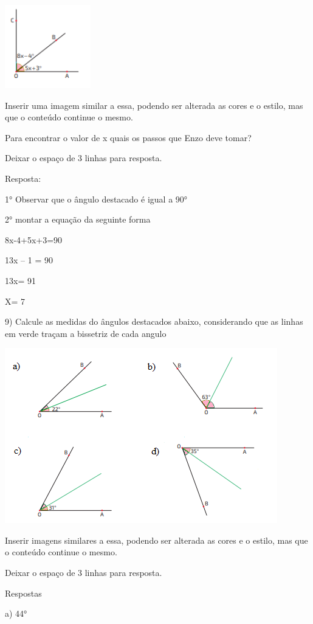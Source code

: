 \includegraphics[width=1.47134in,height=1.42708in]{./imgSAEB_8_MAT/media/image31.png}

Inserir uma imagem similar a essa, podendo ser alterada as cores e o
estilo, mas que o conteúdo continue o mesmo.

Para encontrar o valor de x quais os passos que Enzo deve tomar?

Deixar o espaço de 3 linhas para resposta.

Resposta:

1° Observar que o ângulo destacado é igual a 90°

2° montar a equação da seguinte forma

8x-4+5x+3=90

13x -- 1 = 90

13x= 91

X= 7

9) Calcule as medidas do ângulos destacados abaixo, considerando que as
linhas em verde traçam a bissetriz de cada angulo

\includegraphics[width=4.66667in,height=3in]{./imgSAEB_8_MAT/media/image32.png}

Inserir imagens similares a essa, podendo ser alterada as cores e o
estilo, mas que o conteúdo continue o mesmo.

Deixar o espaço de 3 linhas para resposta.

Respostas

a) 44°

